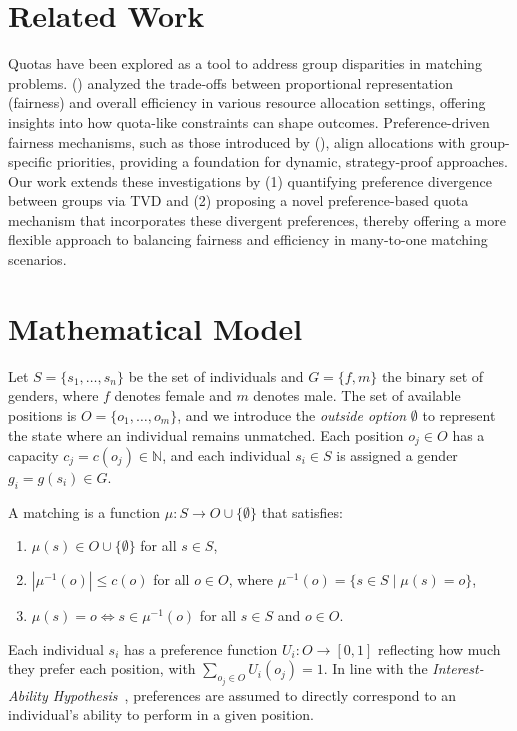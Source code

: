 \documentclass[letterpaper]{article}
\newcommand{\citet}[1]{\citeauthor{#1} (\citeyear{#1})}
\begin{document}
\section{Related Work}

Quotas have been explored as a tool to address group disparities in matching problems. 
\citet{Bertsimas2012OnTE} analyzed the trade-offs between proportional representation (fairness) and overall efficiency in various resource allocation settings, offering insights into how quota-like constraints can shape outcomes. 
Preference-driven fairness mechanisms, such as those introduced by \citet{AzizW14}, align allocations with group-specific priorities, providing a foundation for dynamic, strategy-proof approaches.
Our work extends these investigations by (1) quantifying preference divergence between groups via TVD and (2) proposing a novel preference-based quota mechanism that incorporates these divergent preferences, thereby offering a more flexible approach to balancing 
fairness and efficiency in many-to-one matching scenarios.


\section{Mathematical Model}

Let \( S = \{s_1, \ldots, s_n\} \) be the set of individuals and \( G = \{f, m\} \) the binary set of genders, where \( f \) denotes female and \( m \) denotes male. The set of available positions is \( O = \{o_1, \ldots, o_m\} \), and we introduce the \textit{outside option} \( \emptyset \) to represent the state where an individual remains unmatched. Each position \( o_j \in O \) has a capacity \( c_j = c(o_j) \in \mathbb{N} \), and each individual \( s_i \in S \) is assigned a gender \( g_i = g(s_i) \in G \).

A matching is a function \( \mu : S \to O \cup \{\emptyset\} \) that satisfies:
\begin{enumerate}
    \item \( \mu(s) \in O \cup \{\emptyset\} \) for all \( s \in S \),
    \item  \( |\mu^{-1}(o)| \leq c(o) \) for all \( o \in O \), where \( \mu^{-1}(o) = \{ s \in S \mid \mu(s) = o \} \),
    \item \( \mu(s) = o \iff s \in \mu^{-1}(o) \) for all \( s \in S \) and \( o \in O \).
\end{enumerate}

Each individual \( s_i \) has a preference function \( U_i : O \to [0, 1] \) reflecting how much they prefer each position, with \( \sum_{o_j \in O} U_i(o_j) = 1 \). In line with the \textit{Interest-Ability Hypothesis}~\cite{jintelligence10030043}, preferences are assumed to directly correspond to an individual's ability to perform in a given position.
\end{document}
